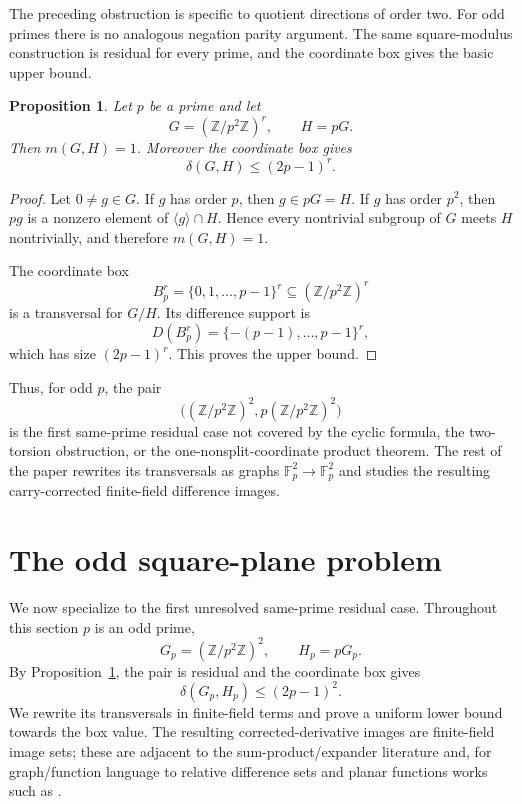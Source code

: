 \documentclass[reqno]{amsart}
\numberwithin{equation}{section}
\newtheorem{proposition}[theorem]{Proposition}
\theoremstyle{definition}
\begin{document}
The preceding obstruction is specific to quotient directions of order two.  For
odd primes there is no analogous negation parity argument.  The same
square-modulus construction is residual for every prime, and the coordinate box
gives the basic upper bound.
\begin{proposition}
\label{prop:residual-square-modulus-pairs}
Let $p$ be a prime and let
\[
  G=(\mathbb Z/p^2\mathbb Z)^r,
  \qquad
  H=pG.
\]
Then $m(G,H)=1$.  Moreover the coordinate box gives
\[
  \delta(G,H)\leq (2p-1)^r.
\]
\end{proposition}

\begin{proof}
Let $0\neq g\in G$.  If $g$ has order $p$, then $g\in pG=H$.  If $g$ has order
$p^2$, then $pg$ is a nonzero element of $\langle g\rangle\cap H$.  Hence every
nontrivial subgroup of $G$ meets $H$ nontrivially, and therefore $m(G,H)=1$.

The coordinate box
\[
  B_p^r=\{0,1,\ldots,p-1\}^r\subseteq(\mathbb Z/p^2\mathbb Z)^r
\]
is a transversal for $G/H$.  Its difference support is
\[
  D(B_p^r)=\{-(p-1),\ldots,p-1\}^r,
\]
which has size $(2p-1)^r$.  This proves the upper bound.
\end{proof}

Thus, for odd $p$, the pair
\[
  \bigl((\mathbb Z/p^2\mathbb Z)^2,
        p(\mathbb Z/p^2\mathbb Z)^2\bigr)
\]
is the first same-prime residual case not covered by the cyclic formula, the
two-torsion obstruction, or the one-nonsplit-coordinate product theorem.  The
rest of the paper rewrites its transversals as graphs
\(\mathbb F_p^2\to\mathbb F_p^2\) and studies the resulting carry-corrected
finite-field difference images.

\section{The odd square-plane problem}
\label{sec:odd-square-plane}

We now specialize to the first unresolved same-prime residual case.  Throughout
this section $p$ is an odd prime,
\[
  G_p=(\mathbb Z/p^2\mathbb Z)^2,
  \qquad
  H_p=pG_p.
\]
By Proposition~\ref{prop:residual-square-modulus-pairs}, the pair is residual
and the coordinate box gives
\[
  \delta(G_p,H_p)\leq (2p-1)^2.
\]
We rewrite its transversals in finite-field terms and prove a uniform lower
bound towards the box value. The resulting corrected-derivative images are finite-field image sets;
these are adjacent to the sum-product/expander literature
\cites{BourgainKatzTao2004,MurphyPetridis2017} and, for graph/function
language to relative difference sets and planar functions works such as
\cite{PottSchmidtZhou2014}.
\end{document}
